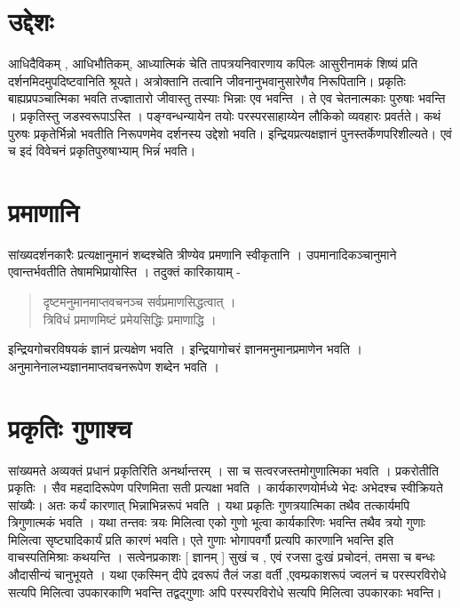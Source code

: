 {\section*{उद्देशः}

आधिदैविकम् , आधिभौतिकम्, आध्यात्मिकं चेति तापत्रयनिवारणाय कपिलः आसुरीनामकं शिष्यं प्रति दर्शनमिदमुपदिष्टवानिति श्रूयते। अत्रोक्तानि तत्वानि जीवनानुभवानुसारेणैव निरूपितानि। प्रकृतिः बाह्यप्रपञ्चात्मिका भवति तज्ज्ञातारो जीवास्तु तस्याः भिन्नाः एव भवन्ति । ते एव चेतनात्मकाः पुरुषाः भवन्ति । प्रकृतिस्तु जडस्वरूपाऽस्ति । पङ्ग्वन्धन्यायेन तयोः परस्परसाहाय्येन लौकिको व्यवहारः प्रवर्तते। कथं पुरुषः प्रकृतेर्भिन्नो भवतीति निरूपणमेव दर्शनस्य उद्देशो भवति। इन्द्रियप्रत्यक्षज्ञानं पुनस्तर्केणपरिशील्यते। एवं च इदं विवेचनं प्रकृतिपुरुषाभ्याम् भिन्नंं भवति।

\section*{प्रमाणानि}

 सांख्यदर्शनकारैः प्रत्यक्षानुमानं शब्दश्चेति त्रीण्येव प्रमणानि स्वीकृतानि । उपमानादिकञ्चानुमाने एवान्तर्भवतीति तेषामभिप्रायोस्ति । तदुक्तं कारिकायाम् - 
\begin{verse}
दृष्टमनुमानमाप्तवचनञ्च सर्वप्रमाणसिद्धत्वात् । \\
त्रिविधं प्रमाणमिष्टं प्रमेयसिद्धिः प्रमाणाद्धि । 
\end{verse}
इन्द्रियगोचरविषयकं ज्ञानं प्रत्यक्षेण भवति । इन्द्रियागोचरं ज्ञानमनुमानप्रमाणेन भवति । अनुमानेनालभ्यज्ञानमाप्तवचनरूपेण शब्देन भवति । 

\section*{प्रकृतिः गुणाश्च}

सांख्यमते अव्यक्तं प्रधानं प्रकृतिरिति अनर्थान्तरम् । सा च सत्वरजस्तमोगुणात्मिका भवति । प्रकरोतीति प्रकृतिः । सैव महदादिरूपेण परिणमिता सती प्रत्यक्षा भवति । कार्यकारणयोर्मध्ये भेदः अभेदश्च स्वीक्रियते सांख्यैः। अतः कर्यं कारणात् भिन्नाभिन्नरूपं भवति । यथा प्रकृतिः गुणत्रयात्मिका तथैव तत्कार्यमपि त्रिगुणात्मकं भवति । यथा तन्तवः त्रयः मिलित्वा एको गुणो भूत्वा कार्यकारिणः भवन्ति तथैव त्रयो गुणाः मिलित्वा सृष्ट्यादिकार्यं प्रति कारणं भवति। एते गुणाः भोगापवर्गौ प्रत्यपि कारणानि भवन्ति इति वाचस्पतिमिश्राः कथयन्ति । सत्वेनप्रकाशः [ ज्ञानम् ] सुखं च , एवं रजसा दुःखं प्रचोदनं, तमसा च बन्धः औदासीन्यं चानुभूयते । यथा एकस्मिन् दीपे द्रवरूपं तैलं जडा वर्ती ,एवम्प्रकाशरूपं ज्वलनं च परस्परविरोधे सत्यपि मिलित्वा उपकारकाणि भवन्ति तद्वद्गुणाः अपि परस्परविरोधे सत्यपि मिलित्वा उपकारकाः भवन्ति।   

}
